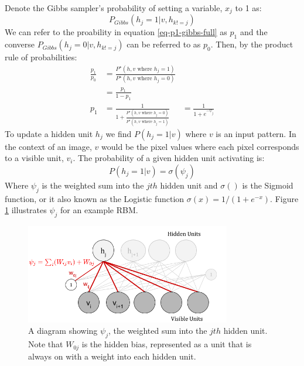     Denote the Gibbs sampler's probability of setting a variable, $x_j$ to 1 as:
    \begin{equation}\label{eq-p1-gibbs-full}
    P_{Gibbs}(h_j = 1 | v, h_{k != j})
    \end{equation}
    We can refer to the proability in equation \ref{eq-p1-gibbs-full} as $p_1$ and the converse $P_{Gibbs}(h_j = 0 | v, h_{k != j})$ can be referred to as $p_0$.
    Then, by the product rule of probabilities:
    $$
    \begin{aligned}
    \frac{p_1}{p_0} &= \frac{P^\star(h,v \text{ where } h_j = 1)}{P^\star(h,v \text{ where } h_j = 0)}\\
    &= \frac{p_1}{1 - p_1} \\
    p_1 &= \frac{1}{1 + \frac{P^\star(h,v \text{ where } h_j = 0)}{P^\star(h,v \text{ where } h_j = 1)} }
    &= \frac{1}{1 + e^{-\psi_j}}
  \end{aligned}
    $$
  To update a hidden unit $h_j$
  we find $ P(h_j = 1 | v) $ where $v$ is an input pattern. In the context of an image, $ v $ would be the pixel values where each pixel corresponds to a visible unit, $v_i$.
  The probability of a given hidden unit activating is:
    \begin{equation}\label{eq:Hid-Gibbs-Update}
    P(h_j = 1 | v) = \sigma(\psi_j)
    \end{equation}
    Where $\psi_j$ is the weighted sum into the $jth$ hidden unit and $\sigma()$ is the Sigmoid function, or it also known as the Logistic function $\sigma(x)=1/(1+e^{-x})$. Figure \ref{F:PSI} illustrates $\psi_j$ for an example RBM.
    \begin{figure}[h]
    \begin{center}
      \includegraphics[width = 0.8\textwidth]{Assets/PSI_and_PHI.png}
    \caption{A diagram showing $\psi_j$, the weighted sum into the $jth$ hidden unit. Note that $W_{0j}$ is the hidden bias, represented as a unit that is always on with a weight into each hidden unit.}
    \label{F:PSI}
    \end{center}
    \end{figure}

